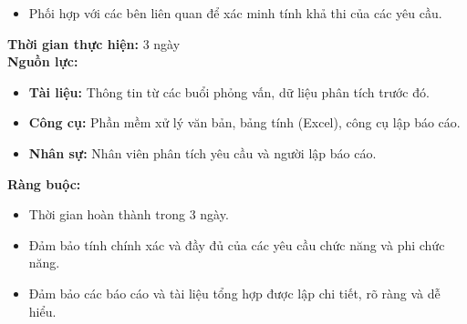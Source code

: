 {\begin{minipage}{\textwidth}
\begin{itemize}
\begin{itemize}
            \item Yêu cầu chức năng: Các chức năng cụ thể phần mềm cần thực hiện.
            \item Yêu cầu phi chức năng: Các tiêu chí kỹ thuật như hiệu suất, bảo mật, khả năng bảo trì,...
        \end{itemize}
        \item Phối hợp với các bên liên quan để xác minh tính khả thi của các yêu cầu.
    \end{itemize}
    \vspace{0.5cm}
    \noindent \textbf{Thời gian thực hiện:} 3 ngày \\
    \noindent \textbf{Nguồn lực:}
    \begin{itemize}
        \item \textbf{Tài liệu:} Thông tin từ các buổi phỏng vấn, dữ liệu phân tích trước đó.
        \item \textbf{Công cụ:} Phần mềm xử lý văn bản, bảng tính (Excel), công cụ lập báo cáo.
        \item \textbf{Nhân sự:} Nhân viên phân tích yêu cầu và người lập báo cáo.
    \end{itemize}
    \vspace{0.5cm}
    \noindent \textbf{Ràng buộc:}
    \begin{itemize}
        \item Thời gian hoàn thành trong 3 ngày.
        \item Đảm bảo tính chính xác và đầy đủ của các yêu cầu chức năng và phi chức năng.
        \item Đảm bảo các báo cáo và tài liệu tổng hợp được lập chi tiết, rõ ràng và dễ hiểu.
    \end{itemize}
    \end{minipage}
}

\newpage %

